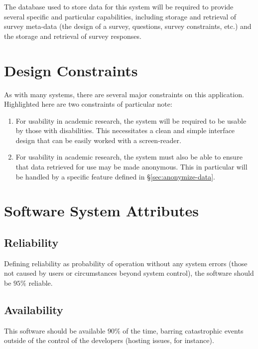 \documentclass[10pt,letter]{report}
\begin{document}
The database used to store data for this system will be required to
provide several specific and particular capabilities, including
storage and retrieval of survey meta-data (the design of a survey,
questions, survey constraints, etc.) and the storage and retrieval of
survey responses.

\section{Design Constraints}
\label{sec:design-constraints}

As with many systems, there are several major constraints on this
application.  Highlighted here are two constraints of particular note:

\begin{enumerate}
\item For usability in academic research, the system will be required
  to be usable by those with disabilities.  This necessitates a clean
  and simple interface design that can be easily worked with a
  screen-reader.
\item For usability in academic research, the system must also be able
  to ensure that data retrieved for use may be made anonymous.  This
  in particular will be handled by a specific feature defined in
  \S\ref{sec:anonymize-data}.
\end{enumerate}

\section{Software System Attributes}
\label{sec:softw-syst-attr}

\subsection{Reliability}
\label{sec:reliability}

Defining reliability as probability of operation without any system
errors (those not caused by users or circumstances beyond system
control), the software should be $95\%$ reliable.

\subsection{Availability}
\label{sec:availability}

This software should be available $90\%$ of the time, barring
catastrophic events outside of the control of the developers (hosting
issues, for instance).
\end{document}
